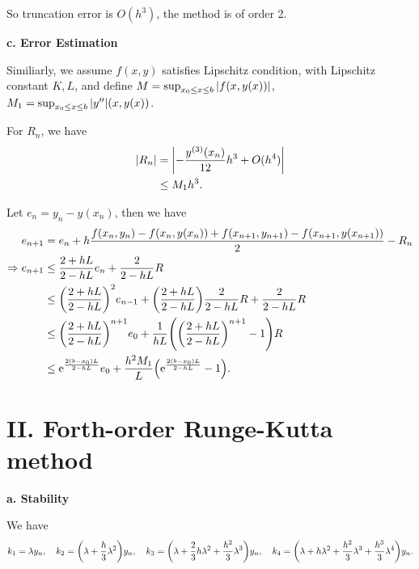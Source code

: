 \documentclass[a4paper]{article}
\begin{document}
So truncation error is $O(h^3)$, the method is of order 2.

\textbf{c. Error Estimation}

Similiarly, we assume $f(x,y)$ satisfies Lipschitz condition, with Lipschitz constant $K, L$, and define $M = \sup_{x_0 \leq x \leq b} \abs{f(x, y(x))}$, $M_1 = \sup_{x_0 \leq x \leq b} \abs{y^{\prime \prime}} (x, y(x))$.

For $R_n$, we have
\begin{equation}
    \begin{aligned}
        \abs{R_n} &= \abs{- \frac{y^{(3)}(x_n)}{12} h^3 + O(h^4)} \\
        &\leq M_1 h^3.
    \end{aligned}
\end{equation}

Let $e_n = y_n - y(x_n)$, then we have 
\begin{equation}
    \begin{aligned}
        e_{n+1} &= e_n + h \frac{f(x_n,y_n)-f(x_n,y(x_n)) + f(x_{n+1}, y_{n+1}) - f(x_{n+1},y(x_{n+1}))}{2} - R_n \\
        \Rightarrow e_{n+1} &\leq \frac{2 + hL}{2 - hL} e_n + \frac{2}{2 - hL} R \\
        &\leq \qty(\frac{2 + hL}{2 - hL})^2 e_{n-1} + \qty(\frac{2 + hL}{2 - hL}) \frac{2}{2 - hL} R + \frac{2}{2 - hL} R \\
        &\leq  \qty(\frac{2 + hL}{2 - hL})^{n+1} e_0 + \frac{1}{hL} \qty(\qty(\frac{2+hL}{2-hL})^{n+1} - 1) R \\
        &\leq \mathrm{e}^{\frac{2(b-x_0)L}{2-hL}} e_0 + \frac{h^2 M_1}{L} \qty(\mathrm{e}^{\frac{2(b-x_0)L}{2-hL}} - 1) .
    \end{aligned}
\end{equation}


\section*{II. Forth-order Runge-Kutta method}

\textbf{a. Stability}

We have 
\begin{equation}
    k_1 = \lambda y_n, \quad k_2 = \qty(\lambda + \frac{h}{3} \lambda^2) y_n, \quad k_3 = \qty(\lambda + \frac{2}{3} h \lambda^2 + \frac{h^2}{3} \lambda^3)y_n, \quad k_4 = \qty(\lambda + h \lambda^2 + \frac{h^2}{3}\lambda^3 + \frac{h^3}{3}\lambda^4)y_n. 
\end{equation}
\end{document}
